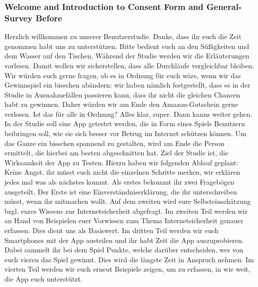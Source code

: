 \subsubsection{Welcome and Introduction to Consent Form and General-Survey Before}
Herzlich willkommen zu unserer Benutzerstudie.
Danke, dass ihr euch die Zeit genommen habt uns zu unterst{\"u}tzen.
Bitte bedient euch an den S{\"u}{\ss}igkeiten und dem Wasser auf den Tischen.
W{\"a}hrend der Studie werden wir die Erl{\"a}uterungen vorlesen. Damit wollen wir sicherstellen, dass alle Durchl{\"a}ufe vergleichbar bleiben. 
\newline
\newline
Wir w{\"u}rden euch gerne fragen, ob es in Ordnung f{\"u}r euch w{\"a}re, wenn wir das Gewinnspiel ein bisschen ab{\"a}ndern: wir haben n{\"a}mlich festgestellt, dass es in der Studie in Ausnahmef{\"a}llen passieren kann, dass ihr nicht die gleichen Chancen habt zu gewinnen. Daher w{\"u}rden wir am Ende den Amazon-Gutschein gerne verlosen. Ist das f{\"u}r alle in Ordnung?
Alles klar, super. Dann kanns weiter gehen.
\newline
\newline
In der Studie soll eine App getestet werden, die in Form eines Spiels Benutzern beibringen soll, wie sie sich besser vor Betrug im Internet sch{\"u}tzen k{\"o}nnen. Um das Ganze ein bisschen spannend zu gestalten, wird am Ende die Person ermittelt, die hierbei am besten abgeschnitten hat.
Ziel der Studie ist, die Wirksamkeit der App zu Testen. Hierzu haben wir folgenden Ablauf geplant:
Keine Angst, ihr m{\"u}sst euch nicht die einzelnen Schritte merken, wir erkl{\"a}ren jedes mal was als n{\"a}chstes kommt.
\newline
\newline
Als erstes bekommt ihr zwei Frageb{\"o}gen ausgeteilt.
Der Erste ist eine Einverst{\"a}ndniserkl{\"a}rung, die ihr unterschreiben m{\"u}sst, wenn ihr mitmachen wollt. Auf dem zweiten wird eure Selbsteinsch{\"a}tzung bzgl. eures Wissens zur Internetsicherheit abgefragt.
Im zweiten Teil werden wir an Hand von Beispielen euer Vorwissen zum Thema Internetsicherheit genauer erfassen. Dies dient uns als Basiswert. 
Im dritten Teil werden wir euch Smartphones mit der App austeilen und ihr habt Zeit die App auszuprobieren. 
Dabei sammelt ihr bei dem Spiel Punkte, welche dar{\"u}ber entscheiden, wer von euch vieren das Spiel gewinnt. Dies wird die l{\"a}ngste Zeit in Anspruch nehmen.
Im vierten Teil werden wir euch erneut Beispiele zeigen, um zu erfassen,
in wie weit, die App euch unterst{\"u}tzt. 
